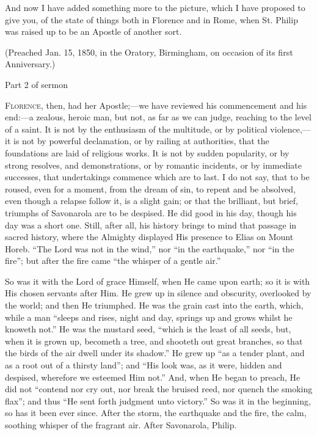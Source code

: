 And now I have added something more to the picture,
which I have proposed to give you, of the state of things
both in Florence and in Rome, when St. Philip was raised
up to be an Apostle of another sort.

(Preached Jan. 15, 1850, in the Oratory, Birmingham, on
occasion of its first Anniversary.)

Part 2 of sermon


F\textsc{lorence}, then, had her Apostle;—we have reviewed
his commencement and his end:—a zealous, heroic man,
but not, as far as we can judge, reaching to the level of
a saint. It is not by the enthusiasm of the multitude, or
by political violence,—it is not by powerful
declamation, or by railing at authorities, that the
foundations are laid of religious works. It is not by
sudden popularity, or by strong resolves, and
demonstrations, or by romantic incidents, or by immediate
successes, that undertakings commence which are to last.
I do not say, that to be roused, even for a moment, from
the dream of sin, to repent and be absolved, even though
a relapse follow it, is a slight gain; or that the
brilliant, but brief, triumphs of Savonarola are to be
despised. He did good in his day, though his day was a
short one. Still, after all, his history brings to mind
that passage in sacred history, where the Almighty
displayed His presence to Elias on Mount Horeb. ``The
Lord was not in the wind,'' nor ``in the
earthquake,'' nor ``in the fire''; but after
the fire came ``the whisper of a gentle air.''

So was it with the Lord of grace Himself, when He came
upon earth; so it is with His chosen servants after Him.
He grew up in silence and obscurity, overlooked by the
world; and then He triumphed. He was the grain cast into
the earth, which, while a man ``sleeps and rises,
night and day, springs up and grows whilst he knoweth
not.'' He was the mustard seed, ``which is the
least of all seeds, but, when it is grown up, becometh a
tree, and shooteth out great branches, so that the birds
of the air dwell under its shadow.'' He grew up
``as a tender plant, and as a root out of a thirsty
land''; and ``His look was, as it were, hidden
and despised, wherefore we esteemed Him not.'' And,
when He began to preach, He did not ``contend nor cry
out, nor break the bruised reed, nor quench the smoking
flax''; and thus ``He sent forth judgment unto
victory.'' So was it in the beginning, so has it been
ever since. After the storm, the earthquake and the fire,
the calm, soothing whisper of the fragrant air. After
Savonarola, Philip.

